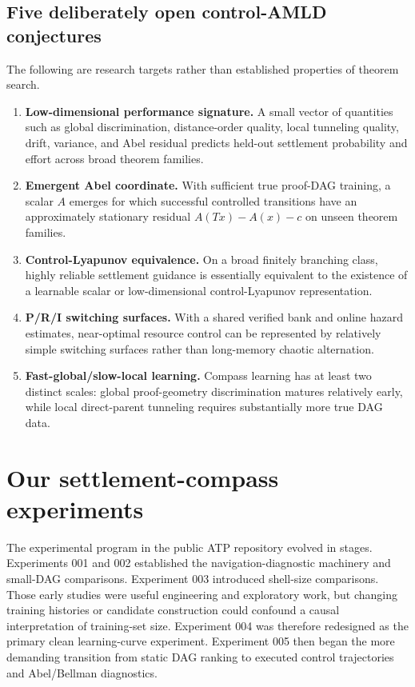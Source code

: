 \subsection{Five deliberately open control-AMLD conjectures}
The following are research targets rather than established properties of theorem search.
\begin{enumerate}[label=\textbf{C\arabic*.},leftmargin=2.2em]
\item \textbf{Low-dimensional performance signature.} A small vector of quantities such as global discrimination, distance-order quality, local tunneling quality, drift, variance, and Abel residual predicts held-out settlement probability and effort across broad theorem families.
\item \textbf{Emergent Abel coordinate.} With sufficient true proof-DAG training, a scalar $A$ emerges for which successful controlled transitions have an approximately stationary residual $A(Tx)-A(x)-c$ on unseen theorem families.
\item \textbf{Control-Lyapunov equivalence.} On a broad finitely branching class, highly reliable settlement guidance is essentially equivalent to the existence of a learnable scalar or low-dimensional control-Lyapunov representation.
\item \textbf{P/R/I switching surfaces.} With a shared verified bank and online hazard estimates, near-optimal resource control can be represented by relatively simple switching surfaces rather than long-memory chaotic alternation.
\item \textbf{Fast-global/slow-local learning.} Compass learning has at least two distinct scales: global proof-geometry discrimination matures relatively early, while local direct-parent tunneling requires substantially more true DAG data.
\end{enumerate}

\section{Our settlement-compass experiments}
\label{sec:compass-experiments}

The experimental program in the public ATP repository evolved in stages. Experiments 001 and 002 established the navigation-diagnostic machinery and small-DAG comparisons. Experiment 003 introduced shell-size comparisons. Those early studies were useful engineering and exploratory work, but changing training histories or candidate construction could confound a causal interpretation of training-set size. Experiment 004 was therefore redesigned as the primary clean learning-curve experiment. Experiment 005 then began the more demanding transition from static DAG ranking to executed control trajectories and Abel/Bellman diagnostics.

